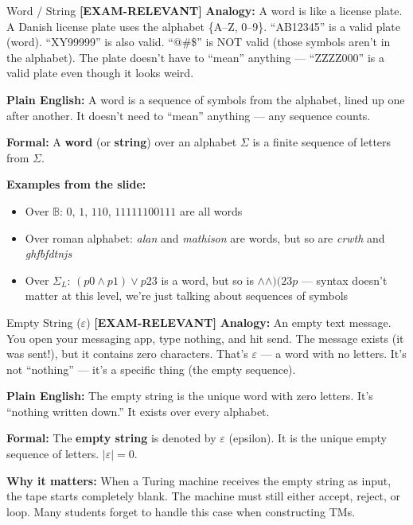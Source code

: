 \documentclass[11pt,a4paper]{article}
\newcommand{\kemark}{\textcolor{red!70!black}{\textbf{[EXAM-RELEVANT]}}}
\begin{document}
\begin{definitionbox}{Word / String \kemark}
\textbf{Analogy:} A word is like a license plate. A Danish license plate uses the alphabet \{A--Z, 0--9\}. ``AB12345'' is a valid plate (word). ``XY99999'' is also valid. ``@\#\$'' is NOT valid (those symbols aren't in the alphabet). The plate doesn't have to ``mean'' anything --- ``ZZZZ000'' is a valid plate even though it looks weird.

\textbf{Plain English:} A word is a sequence of symbols from the alphabet, lined up one after another. It doesn't need to ``mean'' anything --- any sequence counts.

\textbf{Formal:} A \textbf{word} (or \textbf{string}) over an alphabet $\Sigma$ is a finite sequence of letters from $\Sigma$.

\textbf{Examples from the slide:}
\begin{itemize}[nosep]
\item Over $\mathbb{B}$: $0$, $1$, $110$, $11111100111$ are all words
\item Over roman alphabet: \textit{alan} and \textit{mathison} are words, but so are \textit{crwth} and \textit{ghfbfdtnjs}
\item Over $\Sigma_L$: $(p0 \land p1) \lor p23$ is a word, but so is $\land\land)(23p$ --- syntax doesn't matter at this level, we're just talking about sequences of symbols
\end{itemize}
\end{definitionbox}

\begin{definitionbox}{Empty String ($\varepsilon$) \kemark}
\textbf{Analogy:} An empty text message. You open your messaging app, type nothing, and hit send. The message exists (it was sent!), but it contains zero characters. That's $\varepsilon$ --- a word with no letters. It's not ``nothing'' --- it's a specific thing (the empty sequence).

\textbf{Plain English:} The empty string is the unique word with zero letters. It's ``nothing written down.'' It exists over every alphabet.

\textbf{Formal:} The \textbf{empty string} is denoted by $\varepsilon$ (epsilon). It is the unique empty sequence of letters. $|\varepsilon| = 0$.

\textbf{Why it matters:} When a Turing machine receives the empty string as input, the tape starts completely blank. The machine must still either accept, reject, or loop. Many students forget to handle this case when constructing TMs.
\end{definitionbox}
\end{document}
